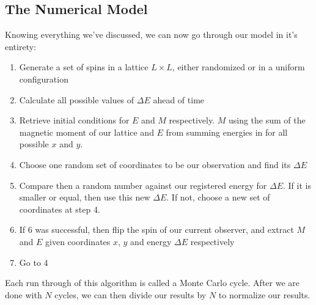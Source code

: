 \documentclass{article}
\begin{document}
\subsection{The Numerical Model} \label{algo}
Knowing everything we've discussed, we can now go through our model in it's entirety:
\begin{enumerate}
    \item Generate a set of spins in a lattice $L\times L$, either randomized or in a uniform configuration
    \item Calculate all possible values of $\Delta E$ ahead of time
    \item Retrieve initial conditions for $E$ and $M$ respectively. $M$ using the sum of the magnetic moment of our lattice and $E$ from summing energies in for all possible $x$ and $y$.
    \item Choose one random set of coordinates to be our observation and find its $\Delta E$
    \item Compare then a random number against our registered energy for $\Delta E$. If it is smaller or equal, then use this new $\Delta E$. If not, choose a new set of coordinates at step 4.
    \item If 6 was successful, then flip the spin of our current observer, and extract $M$ and $E$ given coordinates $x$, $y$ and energy $\Delta E$ respectively
    \item Go to 4
\end{enumerate}
Each run through of this algorithm is called a Monte Carlo cycle. After we are done with $N$ cycles, we can then divide our results by $N$ to normalize our results.
\newpage
\end{document}
